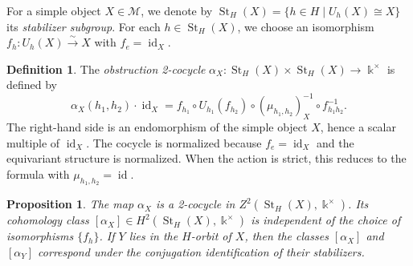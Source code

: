 \documentclass[12pt]{amsart}
\theoremstyle{plain}
\newtheorem{proposition}[theorem]{Proposition}
\theoremstyle{definition} %
\newtheorem{definition}[theorem]{Definition}
\theoremstyle{remark} %
\newcommand{\ku}{{\Bbbk}} %
\newcommand{\cM}{\mathcal{M}}
\newcommand{\id}{\operatorname{id}}
\newcommand{\St}{\operatorname{St}}
\begin{document}
For a simple object $X \in \cM$, we denote by $\St_H(X) = \{h \in H \mid U_h(X) \cong X\}$ its \emph{stabilizer subgroup}. For each $h \in \St_H(X)$, we choose an isomorphism $f_h: U_h(X) \xrightarrow{\sim} X$ with $f_e = \id_X$.

\begin{definition}\label{def:obstruction_cocycle}
The \emph{obstruction 2-cocycle} $\alpha_X: \St_H(X) \times \St_H(X) \to \ku^\times$ is defined by
\begin{equation}
    \alpha_X(h_1, h_2) \cdot \id_X =
    f_{h_1} \circ U_{h_1}(f_{h_2}) \circ
    (\mu_{h_1,h_2})_X^{-1}\circ f_{h_1 h_2}^{-1}.
\end{equation}
The right-hand side is an endomorphism of the simple object $X$, hence a scalar multiple of $\id_X$. The cocycle is normalized because $f_e=\id_X$ and the equivariant structure is normalized. When the action is strict, this reduces to the formula with $\mu_{h_1,h_2}=\id$.
\end{definition}

\begin{proposition}\label{prop:obstruction_cocycle_properties}
The map $\alpha_X$ is a 2-cocycle in $Z^2(\St_H(X), \ku^\times)$. Its cohomology class $[\alpha_X] \in H^2(\St_H(X), \ku^\times)$ is independent of the choice of isomorphisms $\{f_h\}$. If $Y$ lies in the $H$-orbit of $X$, then the classes $[\alpha_X]$ and $[\alpha_Y]$ correspond under the conjugation identification of their stabilizers.
\end{proposition}
\end{document}
